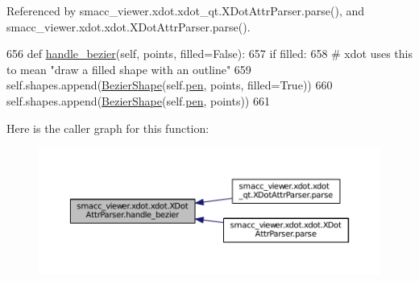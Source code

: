 Referenced by smacc\+\_\+viewer.\+xdot.\+xdot\+\_\+qt.\+X\+Dot\+Attr\+Parser.\+parse(), and smacc\+\_\+viewer.\+xdot.\+xdot.\+X\+Dot\+Attr\+Parser.\+parse().


\begin{DoxyCode}
656     \textcolor{keyword}{def }\hyperlink{classsmacc__viewer_1_1xdot_1_1xdot_1_1XDotAttrParser_a17a326016861ed874135b3c4a55cbabe}{handle\_bezier}(self, points, filled=False):
657         \textcolor{keywordflow}{if} filled:
658             \textcolor{comment}{# xdot uses this to mean "draw a filled shape with an outline"}
659             self.shapes.append(\hyperlink{classsmacc__viewer_1_1xdot_1_1xdot_1_1BezierShape}{BezierShape}(self.\hyperlink{classsmacc__viewer_1_1xdot_1_1xdot_1_1XDotAttrParser_aae80bcd7ba2a33502b1148b1bf4e2130}{pen}, points, filled=\textcolor{keyword}{True}))
660         self.shapes.append(\hyperlink{classsmacc__viewer_1_1xdot_1_1xdot_1_1BezierShape}{BezierShape}(self.\hyperlink{classsmacc__viewer_1_1xdot_1_1xdot_1_1XDotAttrParser_aae80bcd7ba2a33502b1148b1bf4e2130}{pen}, points))
661 
\end{DoxyCode}


Here is the caller graph for this function\+:
\nopagebreak
\begin{figure}[H]
\begin{center}
\leavevmode
\includegraphics[width=350pt]{classsmacc__viewer_1_1xdot_1_1xdot_1_1XDotAttrParser_a17a326016861ed874135b3c4a55cbabe_icgraph}
\end{center}
\end{figure}


